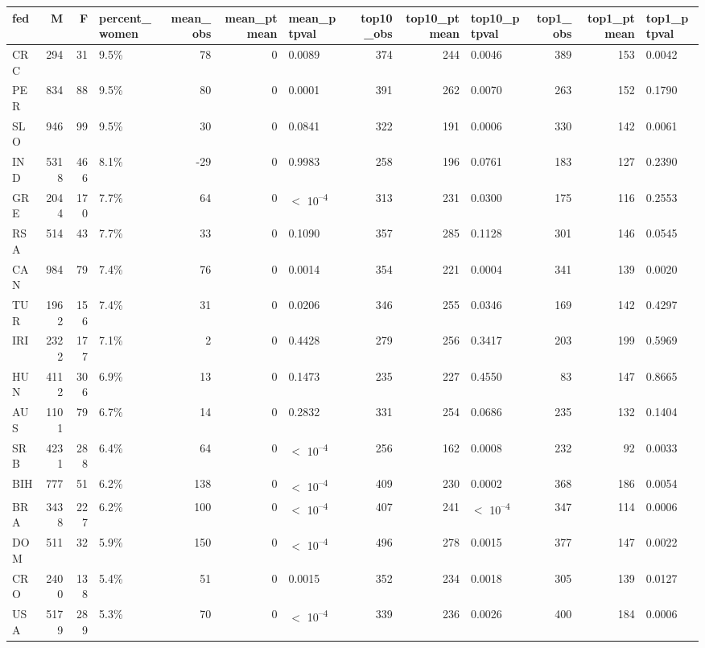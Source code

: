 
\begin{tabular}{l|r|r|l|r|r|l|r|r|l|r|r|l}
\hline
fed & M & F & percent_women & mean_obs & mean_ptmean & mean_ptpval & top10_obs & top10_ptmean & top10_ptpval & top1_obs & top1_ptmean & top1_ptpval\\
\hline
CRC & 294 & 31 & 9.5\% & 78 & 0 & 0.0089 & 374 & 244 & 0.0046 & 389 & 153 & 0.0042\\
\hline
PER & 834 & 88 & 9.5\% & 80 & 0 & 0.0001 & 391 & 262 & 0.0070 & 263 & 152 & 0.1790\\
\hline
SLO & 946 & 99 & 9.5\% & 30 & 0 & 0.0841 & 322 & 191 & 0.0006 & 330 & 142 & 0.0061\\
\hline
IND & 5318 & 466 & 8.1\% & -29 & 0 & 0.9983 & 258 & 196 & 0.0761 & 183 & 127 & 0.2390\\
\hline
GRE & 2044 & 170 & 7.7\% & 64 & 0 & $<$ 10\textsuperscript{--4} & 313 & 231 & 0.0300 & 175 & 116 & 0.2553\\
\hline
RSA & 514 & 43 & 7.7\% & 33 & 0 & 0.1090 & 357 & 285 & 0.1128 & 301 & 146 & 0.0545\\
\hline
CAN & 984 & 79 & 7.4\% & 76 & 0 & 0.0014 & 354 & 221 & 0.0004 & 341 & 139 & 0.0020\\
\hline
TUR & 1962 & 156 & 7.4\% & 31 & 0 & 0.0206 & 346 & 255 & 0.0346 & 169 & 142 & 0.4297\\
\hline
IRI & 2322 & 177 & 7.1\% & 2 & 0 & 0.4428 & 279 & 256 & 0.3417 & 203 & 199 & 0.5969\\
\hline
HUN & 4112 & 306 & 6.9\% & 13 & 0 & 0.1473 & 235 & 227 & 0.4550 & 83 & 147 & 0.8665\\
\hline
AUS & 1101 & 79 & 6.7\% & 14 & 0 & 0.2832 & 331 & 254 & 0.0686 & 235 & 132 & 0.1404\\
\hline
SRB & 4231 & 288 & 6.4\% & 64 & 0 & $<$ 10\textsuperscript{--4} & 256 & 162 & 0.0008 & 232 & 92 & 0.0033\\
\hline
BIH & 777 & 51 & 6.2\% & 138 & 0 & $<$ 10\textsuperscript{--4} & 409 & 230 & 0.0002 & 368 & 186 & 0.0054\\
\hline
BRA & 3438 & 227 & 6.2\% & 100 & 0 & $<$ 10\textsuperscript{--4} & 407 & 241 & $<$ 10\textsuperscript{--4} & 347 & 114 & 0.0006\\
\hline
DOM & 511 & 32 & 5.9\% & 150 & 0 & $<$ 10\textsuperscript{--4} & 496 & 278 & 0.0015 & 377 & 147 & 0.0022\\
\hline
CRO & 2400 & 138 & 5.4\% & 51 & 0 & 0.0015 & 352 & 234 & 0.0018 & 305 & 139 & 0.0127\\
\hline
USA & 5179 & 289 & 5.3\% & 70 & 0 & $<$ 10\textsuperscript{--4} & 339 & 236 & 0.0026 & 400 & 184 & 0.0006\\

\end{tabular}
